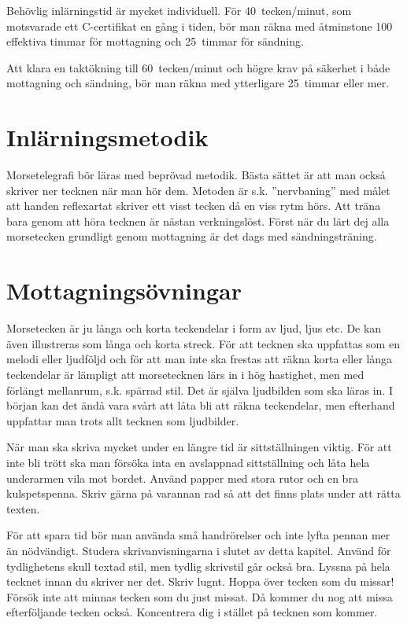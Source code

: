 Behövlig inlärningstid är mycket individuell.
För 40~tecken/minut, som motsvarade ett C-certifikat en gång i tiden, bör man
räkna med åtminstone 100 effektiva timmar för mottagning och 25~timmar för
sändning.

Att klara en taktökning till 60~tecken/minut och högre krav på säkerhet i både
mottagning och sändning, bör man räkna med ytterligare 25~timmar eller mer.

\section{Inlärningsmetodik}

Morsetelegrafi bör läras med beprövad metodik.
Bästa sättet är att man också skriver ner tecknen när man hör dem.
Metoden är s.k. ''nervbaning'' med målet att handen reflexartat skriver ett
visst tecken då en viss rytm hörs.
Att träna bara genom att höra tecknen är nästan verkningslöst.
Först när du lärt dej alla morsetecken grundligt genom mottagning är det dags
med sändningsträning.

\section{Mottagnings\-övningar}

Morsetecken är ju långa och korta teckendelar i form av ljud, ljus etc.
De kan även illustreras som långa och korta streck.
För att tecknen ska uppfattas som en melodi eller ljudföljd och för att man
inte ska frestas att räkna korta eller långa teckendelar är lämpligt att
morsetecknen lärs in i hög hastighet, men med förlängt mellanrum, s.k.
spärrad stil.
Det är själva ljudbilden som ska läras in.
I början kan det ändå vara svårt att låta bli att räkna teckendelar, men
efterhand uppfattar man trots allt tecknen som ljudbilder.

När man ska skriva mycket under en längre tid är sittställningen viktig.
För att inte bli trött ska man försöka inta en avslappnad sittställning och låta
hela underarmen vila mot bordet.
Använd papper med stora rutor och en bra kulspetspenna.
Skriv gärna på varannan rad så att det finns plats under att rätta texten.

För att spara tid bör man använda små handrörelser och inte lyfta pennan mer än
nödvändigt.
Studera skrivanvisningarna i slutet av detta kapitel.
Använd för tydlighetens skull textad stil, men tydlig skrivstil går också bra.
Lyssna på hela tecknet innan du skriver ner det.
Skriv lugnt.
Hoppa över tecken som du missar!
Försök inte att minnas tecken som du just missat.
Då kommer du nog att missa efterföljande tecken också.
Koncentrera dig i stället på tecknen som kommer.

